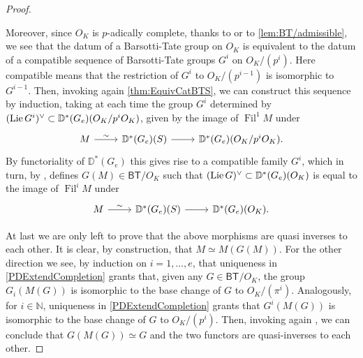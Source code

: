 \begin{proof}
\begin{enumerate}
	Moreover, since $O_K$ is $p$-adically complete, thanks to \cite[Lemma 2.4.4]{deJong}
	or to \cref{lem:BT/admissible},
	we see that the datum of a Barsotti-Tate group on $O_K$ is equivalent to
	the datum of a compatible sequence of Barsotti-Tate groups $G^i$ on $O_K/ (p^i)$.
	Here compatible means that the restriction of $G^i$ to $O_K/ (p^{i-1})$
	is isomorphic to $G^{i-1}$.
	Then, invoking again \cref{thm:EquivCatBTS}, we can construct this sequence by induction,
	taking at each time the group $G^i$ determined by $(\operatorname{Lie} G^i)^\vee \subset
	\mathbb{D}^*(G_e)(O_K/p^iO_K)$, given by the image of $\operatorname{Fil}^1 M$ under
	\begin{equation*}
	\begin{tikzcd}
		M \arrow[r, "\sim", rightarrow] &
		\mathbb{D}^*(G_e)(S) \arrow[r, "", rightarrow] &
		\mathbb{D}^*(G_e)(O_K/p^iO_K)
	.\end{tikzcd}
	\end{equation*}
	By functoriality of $\mathbb{D}^*(G_e)$ this gives rise to a compatible family $G^i$,
	which in turn, by \cite[Lemma 2.4.4]{deJong}, defines $G(M) \in \mathsf{BT}/O_K$
	such that $(\operatorname{Lie} G)^\vee \subset \mathbb{D}^*(G_e)(O_K)$ is
	equal to the image of $\operatorname{Fil}^iM$ under
	\begin{equation*}
	\begin{tikzcd}
		M \arrow[r, "\sim", rightarrow] &
		\mathbb{D}^*(G_e)(S) \arrow[r, "", rightarrow] &
		\mathbb{D}^*(G_e)(O_K)
	.\end{tikzcd}
	\end{equation*}
\end{enumerate}
At last we are only left to prove that the above morphisms are quasi inverses to each other.
It is clear, by construction, that $M \simeq M(G(M))$.
For the other direction we see, by induction on $i = 1, \ldots, e$, that uniqueness in
\cref{PDExtendCompletion} grants that, given any $G \in \mathsf{BT}/O_K$, 
the group $G_i(M(G))$ is isomorphic to the base change of $G$ to $O_K/ (\pi^i)$.
Analogously, for $i \in \mathbb{N}$, uniqueness in \cref{PDExtendCompletion} grants
that $G^i(M(G))$ is isomorphic to the base change of $G$ to $O_K/ (p^i)$.
Then, invoking again \cite[Lemma 2.4.4]{deJong}, we can conclude that $G(M(G)) \simeq G$
and the two functors are quasi-inverses to each other.
\end{proof}


